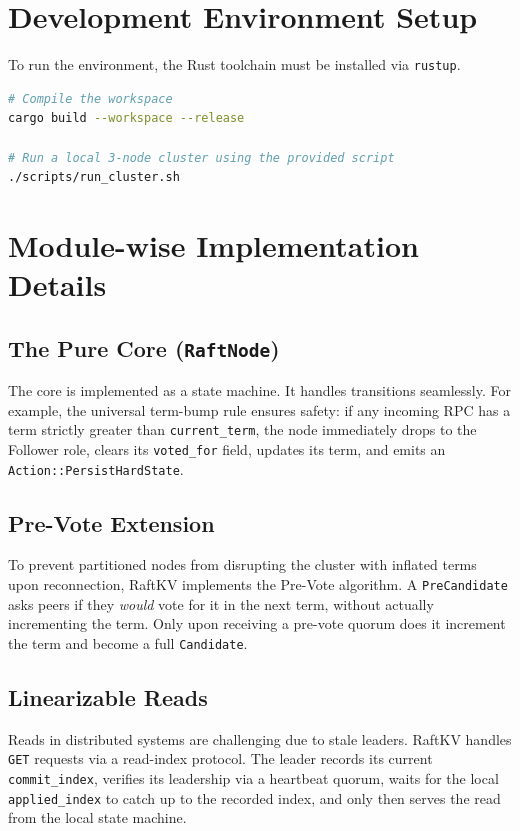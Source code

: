 \documentclass[12pt,a4paper]{report}
\begin{document}
\section{Development Environment Setup}
To run the environment, the Rust toolchain must be installed via \texttt{rustup}. 
\begin{lstlisting}[language=bash, caption=Build and Run Commands]
# Compile the workspace
cargo build --workspace --release

# Run a local 3-node cluster using the provided script
./scripts/run_cluster.sh
\end{lstlisting}

\section{Module-wise Implementation Details}
\subsection{The Pure Core (\texttt{RaftNode})}
The core is implemented as a state machine. It handles transitions seamlessly. For example, the universal term-bump rule ensures safety: if any incoming RPC has a term strictly greater than \texttt{current\_term}, the node immediately drops to the Follower role, clears its \texttt{voted\_for} field, updates its term, and emits an \texttt{Action::PersistHardState}.

\subsection{Pre-Vote Extension}
To prevent partitioned nodes from disrupting the cluster with inflated terms upon reconnection, RaftKV implements the Pre-Vote algorithm. A \texttt{PreCandidate} asks peers if they \textit{would} vote for it in the next term, without actually incrementing the term. Only upon receiving a pre-vote quorum does it increment the term and become a full \texttt{Candidate}.

\subsection{Linearizable Reads}
Reads in distributed systems are challenging due to stale leaders. RaftKV handles \texttt{GET} requests via a read-index protocol. The leader records its current \texttt{commit\_index}, verifies its leadership via a heartbeat quorum, waits for the local \texttt{applied\_index} to catch up to the recorded index, and only then serves the read from the local state machine.
\end{document}

